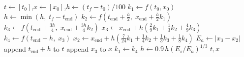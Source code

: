 \documentclass[border=6pt]{standalone}
\begin{document}
\begin{minipage}{4.6in}
\begin{algorithmic}[1]
  \State $t \gets [t_0]$,\quad $x \gets [x_0]$,\quad $h \gets (t_f - t_0)/100$
  \State $k_1 \gets f(t_0, x_0)$
    \State $h \gets \min(h,\; t_f - t_{\text{end}})$
    \State $k_2 \gets f(t_{\text{end}} + \tfrac{h}{2},\; x_{\text{end}} + \tfrac{h}{2} k_1)$
    \State $k_3 \gets f(t_{\text{end}} + \tfrac{3h}{4},\; x_{\text{end}} + \tfrac{3h}{4} k_2)$
    \State $x_3 \gets x_{\text{end}} + h\left(\tfrac{2}{9} k_1 + \tfrac{1}{3} k_2 + \tfrac{4}{9} k_3\right)$ 
    \State $k_4 \gets f(t_{\text{end}} + h,\; x_3)$
    \State $x_2 \gets x_{\text{end}} + h\left(\tfrac{7}{24} k_1 + \tfrac{1}{4} k_2 + \tfrac{1}{3} k_3 + \tfrac{1}{8} k_4\right)$ 
    \State $E_a \gets \lvert x_3 - x_2 \rvert$
      \State append $t_{\text{end}} + h$ to $t$
      \State append $x_3$ to $x$
      \State $k_1 \gets k_4$ 
    \EndIf
    \State $h \gets 0.9\, h \left(E_s / E_a\right)^{1/3}$ 
  \EndWhile
  \State \Return $t, x$
\EndFunction
\end{algorithmic}
\end{minipage}
\end{document}

